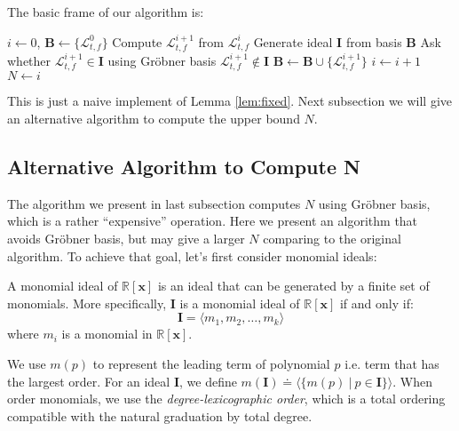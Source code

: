 \documentclass{article}
\begin{document}
The basic frame of our algorithm is: 
\begin{codebox}
\li 	$i \gets 0$, $\boldsymbol{B} \gets \{ \mathcal{L}_{t, f}^0 \}$
\li 	\While {}
\li		\Do
			Compute $\mathcal{L}_{t, f}^{i+1}$ from $\mathcal{L}_{t, f}^i$
\li			Generate ideal $\boldsymbol{I}$ from basis $\boldsymbol{B}$ 
\li			Ask whether $\mathcal{L}_{t, f}^{i+1} \in \boldsymbol{I}$ using Gr\"{o}bner basis 
\li			\If $\mathcal{L}_{t, f}^{i+1} \notin \boldsymbol{I}$
\li				\Then 
					$\boldsymbol{B} \gets \boldsymbol{B} \cup \{ \mathcal{L}_{t, f}^{i+1} \}$
\li					$i \gets i+1$
\li				\Else
\li					\kw{break}
				\End
		\End
\li	$N \gets i$
\end{codebox}

This is just a naive implement of Lemma \ref{lem:fixed}. Next subsection we will give an alternative algorithm to compute the upper bound $N$.

\subsection{Alternative Algorithm to Compute N}
\label{sub:alternative}
The algorithm we present in last subsection computes $N$ using Gr\"{o}bner basis, which is a rather ``expensive'' operation. Here we present an algorithm that avoids Gr\"{o}bner basis, but may give a larger $N$ comparing to the original algorithm. To achieve that goal, let's first consider monomial ideals:

\begin{Definition}
\label{def:monomialIdeal}
A monomial ideal of $\mathbb{R}[\boldsymbol{x}]$ is an ideal that can be generated by a finite set of monomials. More specifically, $\boldsymbol{I}$ is a monomial ideal of $\mathbb{R}[\boldsymbol{x}]$ if and only if: 
\begin{displaymath}
	\boldsymbol{I} = \langle m_1, m_2, \dots, m_k \rangle 
\end{displaymath}
where $m_i$ is a monomial in $\mathbb{R}[\boldsymbol{x}]$.
\end{Definition}

We use $m(p)$ to represent the leading term of polynomial $p$ i.e. term that has the largest order. For an ideal $\boldsymbol{I}$, we define $m(\boldsymbol{I}) \doteq \langle \{m(p)\ |\ p \in \boldsymbol{I} \} \rangle$. When order monomials, we use the \emph{degree-lexicographic order}, which is a total ordering compatible with the natural graduation by total degree. 
\end{document}
